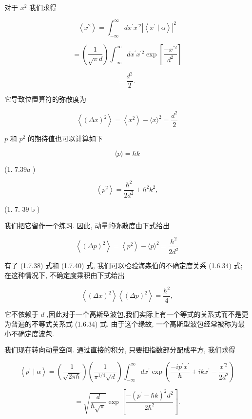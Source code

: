 \documentclass[lang=cn,newtx,10pt,scheme=chinese,thmcnt=section]{elegantbook}
\begin{document}
对于 ${x}^{2}$ 我们求得

$$
\left\langle {x}^{2}\right\rangle = {\int }_{-\infty }^{\infty }d{x}^{\prime }{x}^{\prime 2}{\left| \left\langle {x}^{\prime } \mid \alpha \right\rangle \right| }^{2}
$$

$$
= \left( \frac{1}{\sqrt{\pi }d}\right) {\int }_{-\infty }^{\infty }d{x}^{\prime }{x}^{\prime 2}\exp \left\lbrack \frac{-{x}^{\prime 2}}{{d}^{2}}\right\rbrack \tag{1. 7.37}
$$

$$
= \frac{{d}^{2}}{2}\text{. }
$$

它导致位置算符的弥散度为

$$
\left\langle {\left( \Delta x\right) }^{2}\right\rangle = \left\langle {x}^{2}\right\rangle - \langle x{\rangle }^{2} = \frac{{d}^{2}}{2} \tag{1. 7.38}
$$

$p$ 和 ${p}^{2}$ 的期待值也可以计算如下

$$
\langle p\rangle = \hbar k
$$

(1. ${7.39a}$ )

$$
\left\langle {p}^{2}\right\rangle = \frac{{\hbar }^{2}}{2{d}^{2}} + {\hbar }^{2}{k}^{2},
$$

(1. 7. ${39}\mathrm{\;b}$ )

我们把它留作一个练习. 因此, 动量的弥散度由下式给出

$$
\left\langle {\left( \Delta p\right) }^{2}\right\rangle = \left\langle {p}^{2}\right\rangle - \langle p{\rangle }^{2} = \frac{{\hbar }^{2}}{2{d}^{2}} \tag{1.7.40}
$$

有了 (1.7.38) 式和 (1.7.40) 式, 我们可以检验海森伯的不确定度关系 (1.6.34) 式; 在这种情况下, 不确定度乘积由下式给出

$$
\left\langle {\left( \Delta x\right) }^{2}\right\rangle \left\langle {\left( \Delta p\right) }^{2}\right\rangle = \frac{{\hbar }^{2}}{4}, \tag{1.7.41}
$$

它不依赖于 $d$ ,因此对于一个高斯型波包,我们实际上有一个等式的关系式而不是更为普遍的不等式关系式 (1.6.34) 式. 由于这个缘故, 一个高斯型波包经常被称为最小不确定度波包.

我们现在转向动量空间. 通过直接的积分, 只要把指数部分配成平方, 我们求得

$$
\left\langle {{p}^{\prime } \mid \alpha }\right\rangle = \left( \frac{1}{\sqrt{{2\pi }\hbar }}\right) \left( \frac{1}{{\pi }^{1/4}\sqrt{d}}\right) {\int }_{-\infty }^{\infty }d{x}^{\prime }\exp \left( {\frac{-i{p}^{\prime }{x}^{\prime }}{\hbar } + {ik}{x}^{\prime } - \frac{{x}^{\prime 2}}{2{d}^{2}}}\right) \tag{1.7.42}
$$

$$
= \sqrt{\frac{d}{\hbar \sqrt{\pi }}}\exp \left\lbrack \frac{-{\left( {p}^{\prime } - \hbar k\right) }^{2}{d}^{2}}{2{\hbar }^{2}}\right\rbrack .
$$
\end{document}
